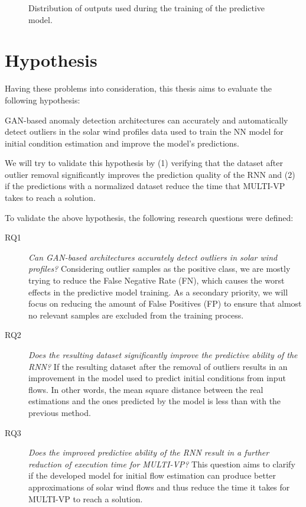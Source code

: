 \begin{figure}[ht]
\begin{subfigure}[b]{0.32\textwidth}
     \end{subfigure}
     \hfill
        \caption{Distribution of outputs used during the training of the predictive model.}
        \label{fig:output_distrib_bp}
\end{figure}

\clearpage
\section{Hypothesis}\label{sec:hypothesis}
Having these problems into consideration, this thesis aims to evaluate the following hypothesis:
\begin{adjustwidth}{2cm}{}
    GAN-based anomaly detection architectures can accurately and automatically detect outliers in the solar wind profiles data used to train the NN model for initial condition estimation and improve the model's predictions.
\end{adjustwidth}

We will try to validate this hypothesis by (1) verifying that the dataset after outlier removal significantly improves the prediction quality of the RNN and (2) if the predictions with a normalized dataset reduce the time that MULTI-VP takes to reach a solution.

To validate the above hypothesis, the following research questions were defined:

\begin{description}
    \item[RQ1] \textit{Can GAN-based architectures accurately detect outliers in solar wind profiles?} Considering outlier samples as the positive class, we are mostly trying to reduce the False Negative Rate (FN), which causes the worst effects in the predictive model training. As a secondary priority, we will focus on reducing the amount of False Positives (FP) to ensure that almost no relevant samples are excluded from the training process.
    \item[RQ2] \textit{Does the resulting dataset significantly improve the predictive ability of the RNN?} If the resulting dataset after the removal of outliers results in an improvement in the model used to predict initial conditions from input flows. In other words, the mean square distance between the real estimations and the ones predicted by the model is less than with the previous method.
    \item[RQ3] \textit{Does the improved predictive ability of the RNN result in a further reduction of execution time for MULTI-VP?} This question aims to clarify if the developed model for initial flow estimation can produce better approximations of solar wind flows and thus reduce the time it takes for MULTI-VP to reach a solution.
\end{description}

